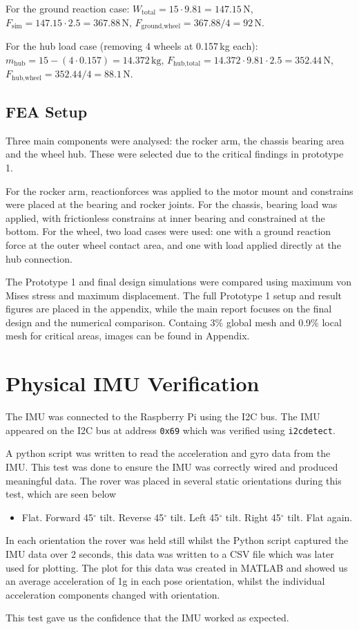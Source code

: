 For the ground reaction case:
$W_{\text{total}} = 15 \cdot 9.81 = 147.15\,\text{N}$, $F_{\text{sim}} = 147.15 \cdot 2.5 = 367.88\,\text{N}$, $F_{\text{ground,wheel}} = 367.88 / 4 = 92\,\text{N}$.

For the hub load case (removing 4 wheels at 0.157\,kg each):
$m_{\text{hub}} = 15 - (4 \cdot 0.157) = 14.372\,\text{kg}$, $F_{\text{hub,total}} = 14.372 \cdot 9.81 \cdot 2.5 = 352.44\,\text{N}$, $F_{\text{hub,wheel}} = 352.44 / 4 = 88.1\,\text{N}$.

\subsection{FEA Setup}

Three main components were analysed: the rocker arm, the chassis bearing area and the wheel hub. These were selected due to the critical findings in prototype 1.

For the rocker arm, reactionforces was applied to the motor mount and constrains were placed at the bearing and rocker joints. For the chassis, bearing load was applied, with frictionless constrains at inner bearing and constrained at the bottom. For the wheel, two load cases were used: one with a ground reaction force at the outer wheel contact area, and one with load applied directly at the hub connection.

The Prototype 1 and final design simulations were compared using maximum von Mises stress and maximum displacement. The full Prototype 1 setup and result figures are placed in the appendix, while the main report focuses on the final design and the numerical comparison.
Containg 3\% global mesh and 0.9\% local mesh for critical areas, images can be found in Appendix.
\section{Physical IMU Verification}
The IMU was connected to the Raspberry Pi using the I2C bus. The IMU appeared on the I2C bus at address \texttt{0x69} which was verified using \texttt{i2cdetect}.

A python script was written to read the acceleration and gyro data from the IMU. This test was done to ensure the IMU was correctly wired and produced meaningful data.
The rover was placed in several static orientations during this test, which are seen below

\begin{itemize}
    \item Flat. Forward 45\(^\circ\) tilt. Reverse 45\(^\circ\) tilt. Left 45\(^\circ\) tilt. Right 45\(^\circ\) tilt. Flat again.
\end{itemize}

In each orientation the rover was held still whilst the Python script captured the IMU data over 2 seconds, this data was written to a CSV file which was later used for plotting.
The plot for this data was created in MATLAB and showed us an average acceleration of 1g in each pose orientation, whilst the individual acceleration components changed with orientation.

This test gave us the confidence that the IMU worked as expected.